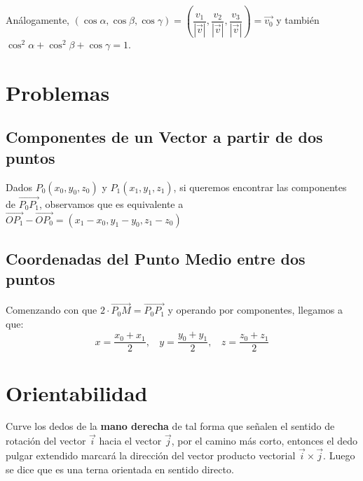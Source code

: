 \documentclass[11pt,a4paper]{article}
\begin{document}
\noindent An\'alogamente, $(\cos \alpha, \cos \beta, \cos \gamma) = \left(\dfrac{v_1}{|\overrightarrow{v}|}, \dfrac{v_2}{|\overrightarrow{v}|}, \dfrac{v_3}{|\overrightarrow{v}|}\right) = \overrightarrow{v_0}$ y tambi\'en $\cos^2\alpha+\cos^2\beta+\cos\gamma=1$.

\section{Problemas}
\subsection{Componentes de un Vector a partir de dos puntos}
Dados $P_0(x_0,y_0,z_0)$ y $P_1(x_1,y_1,z_1)$, si queremos encontrar las componentes de $\overrightarrow{P_0P_1}$, observamos que es equivalente a $\overrightarrow{OP_1}-\overrightarrow{OP_0} = (x_1-x_0, y_1-y_0, z_1-z_0)$
\subsection{Coordenadas del Punto Medio entre dos puntos}
Comenzando con que $2 \cdot \overrightarrow{P_0M} = \overrightarrow{P_0P_1}$ y operando por componentes, llegamos a que: $$x=\dfrac{x_0+x_1}{2},\ \ \ \ y=\dfrac{y_0+y_1}{2},\ \ \ \ z=\dfrac{z_0+z_1}{2}$$

\section{Orientabilidad}
Curve los dedos de la \textbf{mano derecha} de tal forma que señalen el sentido de rotación del vector $\overrightarrow{i}$ hacia el vector $\overrightarrow{j}$, por el camino más corto, entonces el dedo pulgar extendido marcará la dirección del vector producto vectorial $\overrightarrow{i}\times\overrightarrow{j}$. Luego se dice que es una terna orientada en sentido directo.
\end{document}
